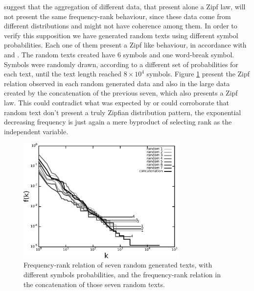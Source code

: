 \cite{cristelli2012} suggest that the aggregation of different data, that present alone a Zipf law, will not present
the same frequency-rank behaviour, since these data come from different distributions and might not have coherence among
them. In order to verify this supposition we have generated random texts using different symbol probabilities. 
Each one of them present a Zipf like behaviour, in accordance with \cite{miller1957} and \cite{li1992}. 
The random texts created have 6 symbols and one word-break symbol. Symbols were randomly drawn, according
to a different set of probabilities for each text, until the text length reached $8 \times 10^4$ symbols.
Figure \ref{fig:freq_rank_random_data_cat_pb} present the Zipf relation observed in each random generated data
and also in the large data created by the concatenation of the previous seven, which also presents a Zipf law.
This could contradict what was expected by \cite{cristelli2012} or could corroborate that random text
don't present a truly Zipfian distribution pattern, the exponential decreasing frequency is just again
a mere byproduct of selecting rank as the independent variable.

\begin{figure}[htbp]
\centering
\includegraphics[width=0.75\textwidth]{images/freq_rank_random_data_cat_pb.pdf}
\caption{Frequency-rank relation of seven random generated texts, with different symbols probabilities, and the frequency-rank relation in the concatenation of those seven random texts.}
\label{fig:freq_rank_random_data_cat_pb}
\end{figure}





